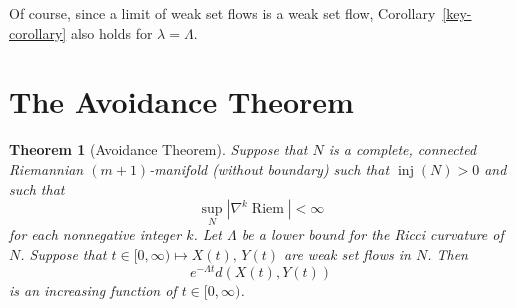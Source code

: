 \documentclass{amsart}
\newcommand{\inj}{\operatorname{inj}}    %
\newcommand{\Riem}{\operatorname{Riem}}
\newcommand{\RR}{\mathbf{R}}  %
\newtheorem{theorem}    {Theorem}   %
\theoremstyle{definition}
\theoremstyle{definition}
\begin{document}
Of course, since a limit of weak set flows is a weak set flow, Corollary~\ref{key-corollary} 
 also holds for $\lambda=\Lambda$.

\section{The Avoidance Theorem}\label{main-section}

\begin{theorem}[Avoidance Theorem]\label{avoidance-theorem}
Suppose that $N$ is a complete, connected Riemannian $(m+1)$-manifold (without boundary)
such that $\inj(N)>0$ and such that
\[
   \sup_N |\nabla^k\Riem| < \infty
\]
for each nonnegative integer $k$.  Let $\Lambda$ be a lower bound for the Ricci curvature of $N$.
Suppose that $t\in [0,\infty)\mapsto X(t), \, Y(t)$ are weak set flows in $N$.
Then 
\[
   e^{-\Lambda t} d(X(t),Y(t))
\]
is an increasing function of $t\in [0,\infty)$.
\end{theorem}
\end{document}
